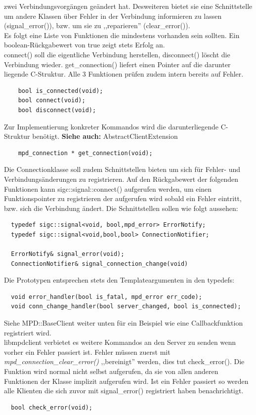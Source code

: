 zwei Verbindungsvorgängen geändert hat. Desweiteren bietet sie eine Schnittstelle um andere Klassen über Fehler in der Verbindung informieren zu lassen (signal\_error()), bzw. um sie zu ,,reparieren'' (clear\_error()).
\\
Es folgt eine Liste von Funktionen die mindestens vorhanden sein sollten.
Ein boolean-Rückgabewert von true zeigt stets Erfolg an.
\\
connect() soll die eigentliche Verbindung herstellen, disconnect() löscht die Verbindung wieder.
get\_connection() liefert einen Pointer auf die darunter liegende C-Struktur.
Alle 3 Funktionen prüfen zudem intern bereits auf Fehler. 
\begin{verbatim}
    bool is_connected(void);
    bool connect(void);
    bool disconnect(void);
\end{verbatim}

Zur Implementierung konkreter Kommandos wird die darunterliegende C-Struktur benötigt.
\textbf{Siehe auch:} AbstractClientExtension
\begin{verbatim}
    mpd_connection * get_connection(void);
\end{verbatim}

Die Connectionklasse soll zudem Schnittstellen bieten um sich für Fehler- und Verbindungsänderungen
zu registrieren. 
Auf den Rückgabewert der folgenden Funktionen kann sigc::signal::connect() aufgerufen werden,
um einen Funktionspointer zu registrieren der aufgerufen wird sobald ein Fehler eintritt,
bzw. sich die Verbindung ändert. Die Schnittstellen sollen wie folgt aussehen:
\begin{verbatim}
  typedef sigc::signal<void, bool,mpd_error> ErrorNotify;
  typedef sigc::signal<void,bool,bool> ConnectionNotifier;
    
  ErrorNotify& signal_error(void);
  ConnectionNotifier& signal_connection_change(void)
\end{verbatim}

Die Prototypen entsprechen stets den Templateargumenten in den typedefs:
\begin{verbatim}
  void error_handler(bool is_fatal, mpd_error err_code);
  void conn_change_handler(bool server_changed, bool is_connected); 
\end{verbatim} 

Siehe MPD::BaseClient weiter unten für ein Beispiel wie eine Callbackfunktion registriert wird.
\\
libmpdclient verbietet es weitere Kommandos an den Server zu senden wenn vorher ein Fehler passiert ist.
Fehler müssen zuerst mit \emph{mpd\_connection\_clear\_error()} ,,bereinigt'' werden, 
dies tut check\_error(). Die Funktion wird normal nicht selbst aufgerufen, da sie von allen anderen Funktionen der Klasse
implizit aufgerufen wird. Ist ein Fehler passiert so werden alle Klienten die sich zuvor
mit signal\_error() registriert haben benachrichtigt. 
\begin{verbatim}
  bool check_error(void);
\end{verbatim}

